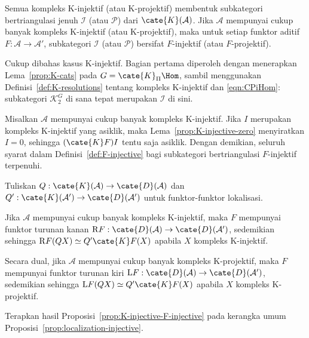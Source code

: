 \begin{proposisi}\label{prop:K-injective-F-injective}
	Semua kompleks K-injektif (atau K-projektif) membentuk subkategori
	bertriangulasi jenuh $\mathcal{I}$ (atau $\mathcal{P}$) dari
	$\cate{K}(\mathcal{A})$. Jika $\mathcal{A}$ mempunyai cukup banyak kompleks
	K-injektif (atau K-projektif), maka untuk setiap funktor aditif
	$F:\mathcal{A}\to\mathcal{A}'$, subkategori $\mathcal{I}$ (atau
	$\mathcal{P}$) bersifat $F$-injektif (atau $F$-projektif).
\end{proposisi}
\begin{bukti}
	Cukup dibahas kasus K-injektif. Bagian pertama diperoleh dengan menerapkan
	Lema~\ref{prop:K-cats} pada $G=\cate{K}_{\Pi}\Hom$, sambil menggunakan
	Definisi~\ref{def:K-resolutions} tentang kompleks K-injektif dan
	\eqref{eqn:CPiHom}: subkategori $\mathcal{K}_2^G$ di sana tepat merupakan
	$\mathcal{I}$ di sini.

	Misalkan $\mathcal{A}$ mempunyai cukup banyak kompleks K-injektif. Jika $I$
	merupakan kompleks K-injektif yang asiklik, maka
	Lema~\ref{prop:K-injective-zero} menyiratkan $I=0$, sehingga
	$(\cate{K}F)I$ tentu saja asiklik. Dengan demikian, seluruh syarat dalam
	Definisi~\ref{def:F-injective} bagi subkategori bertriangulasi $F$-injektif
	terpenuhi.
\end{bukti}

Tuliskan $Q:\cate{K}(\mathcal{A})\to\cate{D}(\mathcal{A})$ dan
$Q':\cate{K}(\mathcal{A}')\to\cate{D}(\mathcal{A}')$ untuk funktor-funktor
lokalisasi.

\begin{korolari}
	Jika $\mathcal{A}$ mempunyai cukup banyak kompleks K-injektif, maka $F$
	mempunyai funktor turunan kanan
	$\mathrm{R}F:\cate{D}(\mathcal{A})\to\cate{D}(\mathcal{A}')$, sedemikian
	sehingga $\mathrm{R}F(QX)\simeq Q'\cate{K}F(X)$ apabila $X$ kompleks
	K-injektif.

	Secara dual, jika $\mathcal{A}$ mempunyai cukup banyak kompleks K-projektif,
	maka $F$ mempunyai funktor turunan kiri
	$\mathrm{L}F:\cate{D}(\mathcal{A})\to\cate{D}(\mathcal{A}')$, sedemikian
	sehingga $\mathrm{L}F(QX)\simeq Q'\cate{K}F(X)$ apabila $X$ kompleks
	K-projektif.
\end{korolari}
\begin{bukti}
	Terapkan hasil Proposisi~\ref{prop:K-injective-F-injective} pada kerangka umum
	Proposisi~\ref{prop:localization-injective}.
\end{bukti}


